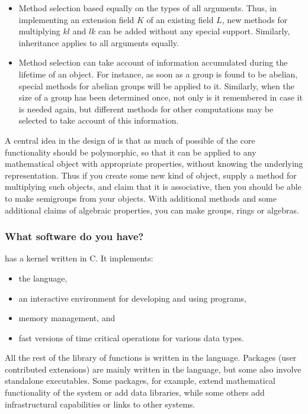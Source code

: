 \begin{itemize}
\item Method selection based equally on the types of all arguments. Thus, in implementing an extension field $K$ of an existing field $L$, new methods for multiplying $kl$ and $lk$ can be added without any special support. Similarly, inheritance applies to all arguments equally.

\item Method selection can take account of information accumulated during the lifetime of an object. For instance, as soon as a group is found to be abelian, special methods for abelian groups will be applied to it. Similarly, when the size of a group has been determined once, not only is it remembered in case it is needed again, but different methods for other computations may be selected to take account of this information.
\end{itemize}

A central idea in the design of \GAP is that as much of possible of the core functionality should be polymorphic, so that it can be applied to any mathematical object with appropriate properties, without knowing the underlying representation. Thus if you create some new kind of \GAP object, supply a method for multiplying such objects, and claim that it is associative, then you should be able to make semigroups from your objects. With additional methods and some additional claims of algebraic properties, you can make groups, rings or algebras.

\subsubsection{What software do you have?}
\GAP has a kernel written in C. It implements:
\begin{itemize}
\item the \GAP language,
\item  an interactive environment for developing and using \GAP programs,
\item  memory management, and
\item  fast versions of time critical operations for various data types.
\end{itemize}
All the rest of the library of functions is written in the \GAP language. Packages (user contributed extensions) are mainly written in the \GAP language, but some also involve standalone executables. Some packages, for example, extend mathematical functionality of the system or add data libraries, while some others add infrastructural capabilities or links to other systems.

